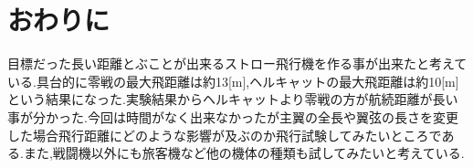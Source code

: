 \chapter{おわりに}
目標だった長い距離とぶことが出来るストロー飛行機を作る事が出来たと考えている.具台的に零戦の最大飛距離は約13[m],ヘルキャットの最大飛距離は約10[m]という結果になった.実験結果からヘルキャットより零戦の方が航続距離が長い事が分かった.今回は時間がなく出来なかったが主翼の全長や翼弦の長さを変更した場合飛行距離にどのような影響が及ぶのか飛行試験してみたいところである.また,戦闘機以外にも旅客機など他の機体の種類も試してみたいと考えている.
